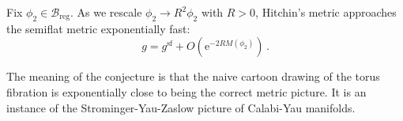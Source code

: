 \documentclass[12pt,letterpaper,reqno]{article}
\numberwithin{equation}{section}
\newcommand{\cB}{\ensuremath{\mathcal B}}
\newcommand{\cM}{\ensuremath{\mathcal M}}
\newcommand{\cO}{\ensuremath{\mathcal O}}
\newcommand{\half}{\ensuremath{\frac{1}{2}}}
\newcommand{\kahler}{K\"ahler\xspace}
\newcommand{\hk}{hyperk\"ahler\xspace}
\newcommand{\I}{{\mathrm i}}
\newcommand{\e}{{\mathrm e}}
\newcommand{\de}{\mathrm{d}}
\newcommand{\reg}{\mathrm{reg}}
\renewcommand{\sf}{\mathrm{sf}}
\DeclareMathOperator{\im}{Im}
\DeclareMathOperator{\Hom}{Hom}
\newcommand{\SU}{\mathrm{SU}}
\newcommand{\U}{\mathrm{U}}
\begin{document}
\begin{conj} \label{conj:weak-metric}
Fix $\phi_2 \in \cB_\reg$.
As we rescale $\phi_2 \to R^2 \phi_2$ with $R > 0$,
Hitchin's metric approaches the semiflat metric
exponentially fast:
\begin{equation}
  g = g^\sf + O(\e^{-2 R M(\phi_2)}) \, .
\end{equation}
\end{conj}






The meaning of the conjecture is that the naive cartoon drawing of the
torus fibration is exponentially close to being the correct metric picture.
It is an instance of the Strominger-Yau-Zaslow picture of Calabi-Yau
manifolds.
\end{document}
